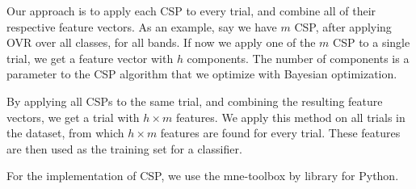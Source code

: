Our approach is to apply each CSP to every trial, and combine all of their respective feature vectors. As an example, say we have $m$ CSP, after applying OVR over all classes, for all bands. If now we apply one of the $m$ CSP to a single trial, we get a feature vector with $h$ components. The number of components is a parameter to the CSP algorithm that we optimize with Bayesian optimization.

By applying all CSPs to the same trial, and combining the resulting feature vectors, we get a trial with $h \times m$ features. We apply this method on all trials in the dataset, from which $h \times m$ features are found for every trial. These features are then used as the training set for a classifier.

For the implementation of CSP, we use the mne-toolbox by \citep{gramfort2014mne} library for Python.
